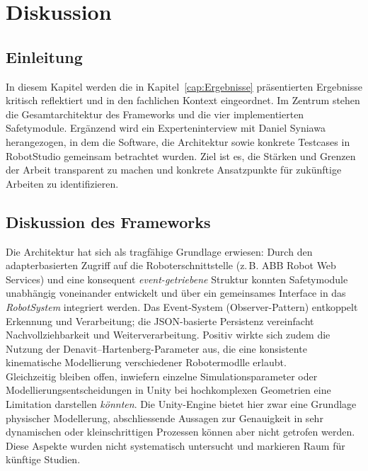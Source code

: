 \chapter{Diskussion}
\label{cap:diskussion}

\section{Einleitung} In diesem Kapitel werden die in
Kapitel~\ref{cap:Ergebnisse} präsentierten
Ergebnisse kritisch reflektiert und in den fachlichen Kontext eingeordnet. Im
Zentrum stehen die Gesamtarchitektur des Frameworks und die vier implementierten
Safetymodule. Ergänzend wird ein Experteninterview mit Daniel Syniawa
herangezogen, in dem die Software, die Architektur sowie konkrete Testcases in
RobotStudio gemeinsam betrachtet wurden. Ziel ist es, die Stärken und Grenzen
der Arbeit transparent zu machen und konkrete Ansatzpunkte für zukünftige
Arbeiten zu identifizieren.

\section{Diskussion des Frameworks}

Die Architektur hat sich als tragfähige Grundlage erwiesen: Durch den
adapterbasierten Zugriff auf die Roboterschnittstelle (z.\,B. ABB Robot Web
Services) und eine konsequent \emph{event-getriebene} Struktur konnten
Safetymodule unabhängig voneinander entwickelt und über ein gemeinsames
Interface in das \emph{RobotSystem} integriert werden. Das Event-System
(Observer-Pattern) entkoppelt Erkennung und Verarbeitung; die JSON-basierte
Persistenz vereinfacht Nachvollziehbarkeit und Weiterverarbeitung. Positiv
wirkte sich zudem die Nutzung der Denavit–Hartenberg-Parameter aus, die eine
konsistente kinematische Modellierung verschiedener Robotermodlle erlaubt.\\

\noindent Gleichzeitig bleiben offen, inwiefern einzelne Simulationsparameter
oder Modellierungsentscheidungen in Unity bei hochkomplexen Geometrien eine
Limitation darstellen \emph{könnten}. Die Unity-Engine bietet hier zwar eine
Grundlage physischer Modellerung, abschliessende Aussagen zur Genauigkeit in
sehr dynamischen oder kleinschrittigen Prozessen können aber nicht getrofen
werden. Diese Aspekte wurden nicht systematisch untersucht und markieren Raum
für künftige Studien.\\

